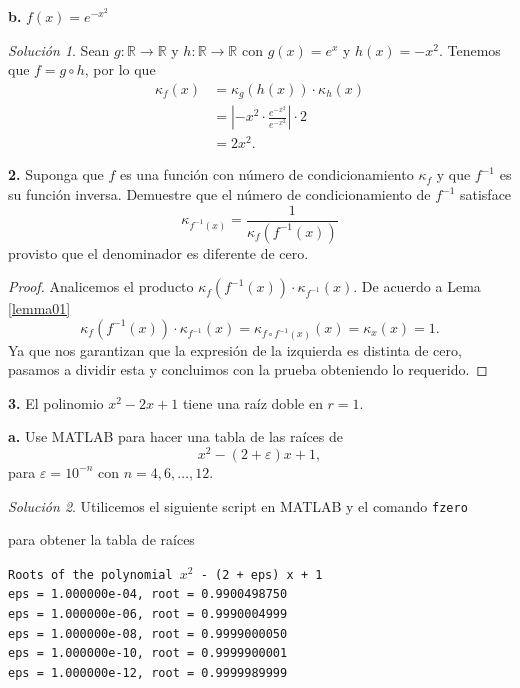 \documentclass{article}
\newenvironment{statement}[1]{\smallskip\noindent\color[rgb]{1.00,0.00,0.50} {\bf #1.}}{}
\theoremstyle{definition}
\theoremstyle{remark}
\newtheorem*{solution}{Soluci\'on}
\newcommand{\BR}{\mathbb R}
\begin{document}
\begin{statement}{b}
  $f(x) = e^{-x^2}$
\end{statement}

\begin{solution}
  Sean $g: \BR \to \BR$ y $h: \BR \to \BR$ con $g(x) = e^x$ y $h(x) = -x^2$.
  Tenemos que $f = g \circ h$, por lo que
  \begin{align*}
    \kappa_f(x) &= \kappa_g(h(x)) \cdot \kappa_h(x) \\
    &= \left|-x^2 \cdot \frac{e^{-x^2}}{e^{-x^2}}\right|\cdot 2 \\
    &= 2x^2.
  \end{align*}
\end{solution}

\begin{statement}{2}
  Suponga que $f$ es una funci\'on con n\'umero de condicionamiento
  $\kappa_f$ y que $f^{-1}$ es su funci\'on inversa. Demuestre que el n\'umero
  de condicionamiento de $f^{-1}$ satisface
  \[
    \kappa_{f^{-1}(x)} = \frac{1}{\kappa_f(f^{-1}(x))}
  \]
  provisto que el denominador es diferente de cero.
\end{statement}

\begin{proof}
  Analicemos el producto $\kappa_f(f^{-1}(x)) \cdot \kappa_{f^{-1}}(x)$.
  De acuerdo a Lema \ref{lemma01}
  \[
    \kappa_f(f^{-1}(x)) \cdot \kappa_{f^{-1}}(x) = \kappa_{f \circ f^{-1}(x)}(x) = \kappa_x(x) = 1.
  \]
  Ya que nos garantizan que la expresi\'on de la izquierda es distinta de cero,
  pasamos a dividir esta y concluimos con la prueba obteniendo lo requerido.
\end{proof}

\begin{statement}{3}
  El polinomio $x^2 - 2x + 1$ tiene una ra\'iz doble en $r = 1$.
\end{statement}

\begin{statement}{a}
  Use MATLAB para hacer una tabla de las ra\'ices de
  \[
    x^2 - (2 + \varepsilon)x + 1,  
  \]
  para $\varepsilon = 10^{-n}$ con $n = 4, 6, \dots, 12$.
\end{statement}

\begin{solution}
  Utilicemos el siguiente script en MATLAB y el comando \texttt{fzero}

  

  para obtener la tabla de ra\'ices
  \begin{center}
    \texttt{Roots of the polynomial $x^2$ - (2 + eps) x + 1}\\
    \texttt{eps = 1.000000e-04, root = 0.9900498750}\\
    \texttt{eps = 1.000000e-06, root = 0.9990004999}\\
    \texttt{eps = 1.000000e-08, root = 0.9999000050}\\
    \texttt{eps = 1.000000e-10, root = 0.9999900001}\\
    \texttt{eps = 1.000000e-12, root = 0.9999989999}
  \end{center}
\end{solution}
\end{document}
